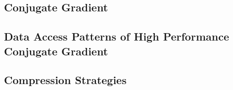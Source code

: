 
\subsection{Conjugate Gradient}


\subsection{Data Access Patterns of High Performance Conjugate Gradient}


\subsection{Compression Strategies		}

